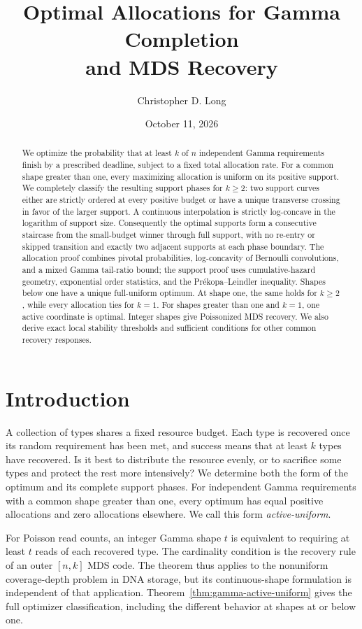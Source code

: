 \documentclass[11pt]{article}
\title{Optimal Allocations for Gamma Completion\\and MDS Recovery}
\author{Christopher D. Long}
\date{October 11, 2026}
\theoremstyle{definition}
\theoremstyle{remark}
\newcommand{\1}{\mathbf 1}
\begin{document}
\maketitle
\begin{abstract}
We optimize the probability that at least \(k\) of \(n\) independent Gamma requirements finish by a prescribed deadline, subject to a fixed total allocation rate. For a common shape greater than one, every maximizing allocation is uniform on its positive support. We completely classify the resulting support phases for \(k\ge2\): two support curves either are strictly ordered at every positive budget or have a unique transverse crossing in favor of the larger support. A continuous interpolation is strictly log-concave in the logarithm of support size. Consequently the optimal supports form a consecutive staircase from the small-budget winner through full support, with no re-entry or skipped transition and exactly two adjacent supports at each phase boundary. The allocation proof combines pivotal probabilities, log-concavity of Bernoulli convolutions, and a mixed Gamma tail-ratio bound; the support proof uses cumulative-hazard geometry, exponential order statistics, and the Pr\'ekopa--Leindler inequality. Shapes below one have a unique full-uniform optimum. At shape one, the same holds for \(k\ge2\), while every allocation ties for \(k=1\). For shapes greater than one and \(k=1\), one active coordinate is optimal. Integer shapes give Poissonized MDS recovery. We also derive exact local stability thresholds and sufficient conditions for other common recovery responses.
\end{abstract}

\section{Introduction}
A collection of types shares a fixed resource budget. Each type is recovered once its random requirement has been met, and success means that at least \(k\) types have recovered. Is it best to distribute the resource evenly, or to sacrifice some types and protect the rest more intensively? We determine both the form of the optimum and its complete support phases. For independent Gamma requirements with a common shape greater than one, every optimum has equal positive allocations and zero allocations elsewhere. We call this form \emph{active-uniform}.

For Poisson read counts, an integer Gamma shape \(t\) is equivalent to requiring at least \(t\) reads of each recovered type. The cardinality condition is the recovery rule of an outer \([n,k]\) MDS code. The theorem thus applies to the nonuniform coverage-depth problem in DNA storage, but its continuous-shape formulation is independent of that application. Theorem~\ref{thm:gamma-active-uniform} gives the full optimizer classification, including the different behavior at shapes at or below one.
\end{document}

